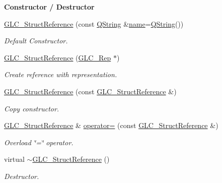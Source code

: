 \begin{Indent}{\bf Constructor / Destructor}\par
\begin{DoxyCompactItemize}
\item 
\hyperlink{class_g_l_c___struct_reference_a1b3d54509f4d27598d0dd2312e063cd2}{G\-L\-C\-\_\-\-Struct\-Reference} (const \hyperlink{group___u_a_v_objects_plugin_gab9d252f49c333c94a72f97ce3105a32d}{Q\-String} \&\hyperlink{glext_8h_ad977737dfc9a274a62741b9500c49a32}{name}=\hyperlink{group___u_a_v_objects_plugin_gab9d252f49c333c94a72f97ce3105a32d}{Q\-String}())
\begin{DoxyCompactList}\small\item\em Default Constructor. \end{DoxyCompactList}\item 
\hyperlink{class_g_l_c___struct_reference_a5dcab2f5fb25ee6973e3f8bbd742042e}{G\-L\-C\-\_\-\-Struct\-Reference} (\hyperlink{class_g_l_c___rep}{G\-L\-C\-\_\-\-Rep} $\ast$)
\begin{DoxyCompactList}\small\item\em Create reference with representation. \end{DoxyCompactList}\item 
\hyperlink{class_g_l_c___struct_reference_a9fbb2765bf2bf61a99603bd4829c8930}{G\-L\-C\-\_\-\-Struct\-Reference} (const \hyperlink{class_g_l_c___struct_reference}{G\-L\-C\-\_\-\-Struct\-Reference} \&)
\begin{DoxyCompactList}\small\item\em Copy constructor. \end{DoxyCompactList}\item 
\hyperlink{class_g_l_c___struct_reference}{G\-L\-C\-\_\-\-Struct\-Reference} \& \hyperlink{class_g_l_c___struct_reference_ae681fbbd35ea4724f8877c1be28521cf}{operator=} (const \hyperlink{class_g_l_c___struct_reference}{G\-L\-C\-\_\-\-Struct\-Reference} \&)
\begin{DoxyCompactList}\small\item\em Overload \char`\"{}=\char`\"{} operator. \end{DoxyCompactList}\item 
virtual \hyperlink{class_g_l_c___struct_reference_abbec29e02dcfe670453eb8f605d674a9}{$\sim$\-G\-L\-C\-\_\-\-Struct\-Reference} ()
\begin{DoxyCompactList}\small\item\em Destructor. \end{DoxyCompactList}\end{DoxyCompactItemize}
\end{Indent}
